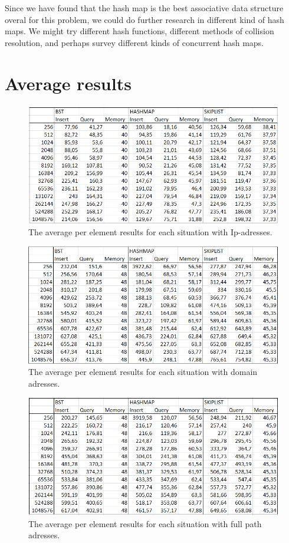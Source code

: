 \documentclass[12pt,a4paper]{article}
\begin{document}
    Since we have found that the hash map is the best associative data structure overal for this
    problem, we could do further research in different kind of hash maps. We might try different
    hash functions, different methods of collision resolution, and perhaps survey different kinds of
    concurrent hash maps.

    

    

    \newpage
    \appendix
    \section{Average results} \label{App:AveResults}

    \begin{figure}[h!]
    \centering
    \includegraphics[width=\textwidth]{Ip-address_averages.png}
    \caption{The average per element results for each situation with Ip-adresses.}
    \end{figure}

    \begin{figure}[h!]
    \centering
    \includegraphics[width=\textwidth]{Domain_averages.png}
    \caption{The average per element results for each situation with domain adresses.}
    \end{figure}

    \begin{figure}[h!]
    \centering
    \includegraphics[width=\textwidth]{Full_path_averages.png}
    \caption{The average per element results for each situation with full path adresses.}
    \end{figure}
\end{document}
